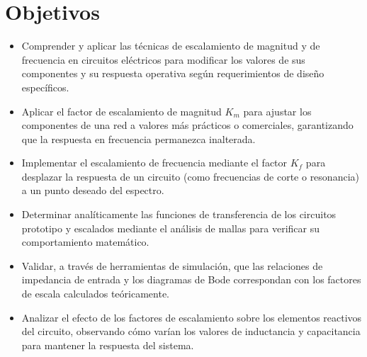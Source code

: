 \section{Objetivos}

\begin{itemize}
	\item Comprender y aplicar las técnicas de escalamiento de magnitud y de frecuencia en circuitos eléctricos para modificar los valores de sus componentes y su respuesta operativa según requerimientos de diseño específicos.
	\item Aplicar el factor de escalamiento de magnitud $K_m$ para ajustar los componentes de una red a valores más prácticos o comerciales, garantizando que la respuesta en frecuencia permanezca inalterada.
	\item Implementar el escalamiento de frecuencia mediante el factor $K_f$ para desplazar la respuesta de un circuito (como frecuencias de corte o resonancia) a un punto deseado del espectro.
	\item Determinar analíticamente las funciones de transferencia de los circuitos prototipo y escalados mediante el análisis de mallas para verificar su comportamiento matemático.
	\item Validar, a través de herramientas de simulación, que las relaciones de impedancia de entrada y los diagramas de Bode correspondan con los factores de escala calculados teóricamente.
	\item Analizar el efecto de los factores de escalamiento sobre los elementos reactivos del circuito, observando cómo varían los valores de inductancia y capacitancia para mantener la respuesta del sistema.
\end{itemize}